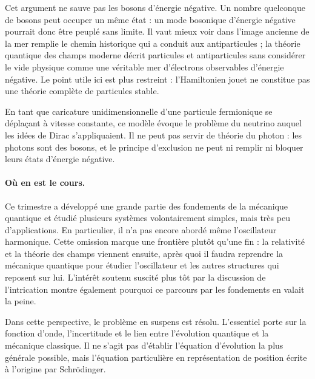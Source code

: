 Cet argument ne sauve pas les bosons d’énergie négative. Un nombre quelconque de bosons peut occuper un même état : un mode bosonique d’énergie négative pourrait donc être peuplé sans limite. Il vaut mieux voir dans l’image ancienne de la mer remplie le chemin historique qui a conduit aux antiparticules ; la théorie quantique des champs moderne décrit particules et antiparticules sans considérer le vide physique comme une véritable mer d’électrons observables d’énergie négative. Le point utile ici est plus restreint : l’Hamiltonien jouet ne constitue pas une théorie complète de particules stable.

En tant que caricature unidimensionnelle d’une particule fermionique se déplaçant à vitesse constante, ce modèle évoque le problème du neutrino auquel les idées de Dirac s’appliquaient. Il ne peut pas servir de théorie du photon : les photons sont des bosons, et le principe d’exclusion ne peut ni remplir ni bloquer leurs états d’énergie négative.

\begin{classroomqa}
\end{classroomqa}

\paragraph{Où en est le cours.}
Ce trimestre a développé une grande partie des fondements de la mécanique quantique et étudié plusieurs systèmes volontairement simples, mais très peu d’applications. En particulier, il n’a pas encore abordé même l’oscillateur harmonique. Cette omission marque une frontière plutôt qu’une fin : la relativité et la théorie des champs viennent ensuite, après quoi il faudra reprendre la mécanique quantique pour étudier l’oscillateur et les autres structures qui reposent sur lui. L’intérêt soutenu suscité plus tôt par la discussion de l’intrication montre également pourquoi ce parcours par les fondements en valait la peine.

Dans cette perspective, le problème en suspens est résolu. L’essentiel porte sur la fonction d’onde, l’incertitude et le lien entre l’évolution quantique et la mécanique classique. Il ne s’agit pas d’établir l’équation d’évolution la plus générale possible, mais l’équation particulière en représentation de position écrite à l’origine par Schr\"odinger.

